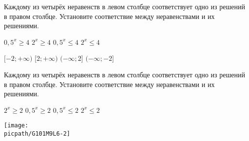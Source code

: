 \begin{class}[number=6]
\begin{listofex}
		\item Каждому из четырёх неравенств в левом столбце соответствует одно из решений в правом столбце. Установите соответствие между неравенствами и их решениями. \\
		\begin{minipage}[t]{\bodywidth}
			\begin{tasks}
				\task \( 0,5^x \ge 4 \)
				\task \( 2^x \ge 4 \)
				\task \( 0,5^x \le 4 \)
				\task \( 2^x \le 4 \)
			\end{tasks}
		\end{minipage}
		\hspace{0.02\linewidth}
		\begin{minipage}[t]{\picwidth}
			\begin{tasks}
				\task \( [-2; +\infty) \)
				\task \( [2; +\infty) \)
				\task \( (- \infty; 2] \)
				\task \( (- \infty; -2] \)
			\end{tasks}
		\end{minipage}
		
		\item Каждому из четырёх неравенств в левом столбце соответствует одно из решений в правом столбце. Установите соответствие между неравенствами и их решениями. \\
		\begin{minipage}[t]{\bodywidth}
			\begin{tasks}
				\task \( 2^x \ge 2 \)
				\task \( 0,5^x \ge 2 \)
				\task \( 0,5^x \le 2\)
				\task \( 2^x \le 2 \)
			\end{tasks}
		\end{minipage}
		\hspace{0.02\linewidth}
		\begin{minipage}[t]{\picwidth}
			\texttt{[image: \\picpath/G101M9L6-2]}
		\end{minipage}
		

\end{listofex}
\end{class}

